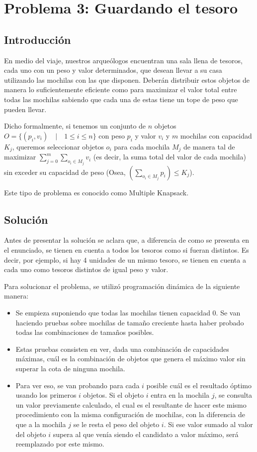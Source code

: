 \section{Problema 3: Guardando el tesoro}

\subsection{Introducción}

En medio del viaje, nuestros arqueólogos encuentran una sala llena de tesoros, cada uno con un peso y valor determinados, que desean llevar a su casa utilizando las mochilas con las que disponen. Deberán distribuir estos objetos de manera lo suficientemente eficiente como para maximizar el valor total entre todas las mochilas sabiendo que cada una de estas tiene un tope de peso que pueden llevar.

Dicho formalmente, si tenemos un conjunto de $n$ objetos $O = \{(p_i,v_i) \quad | \quad 1 \leq i \leq n\}$ con peso $p_i$ y valor $v_i$ y $m$ mochilas con capacidad $K_j$, queremos seleccionar objetos $o_i$ para cada mochila $M_j$ de manera tal de maximizar $\sum_{j = 0}^m\sum_{o_i \in M_j} v_i$ (es decir, la suma total del valor de cada mochila) sin exceder su capacidad de peso (Osea, $(\sum_{o_i \in M_j} p_i) \leq K_j$).

Este tipo de problema es conocido como Multiple Knapsack.

\subsection{Solución}

Antes de presentar la solución se aclara que, a diferencia de como se presenta en el enunciado, se tienen en cuenta a todos los tesoros como si fueran distintos. Es decir, por ejemplo, si hay 4 unidades de un mismo tesoro, se tienen en cuenta a cada uno como tesoros distintos de igual peso y valor.

Para solucionar el problema, se utilizó programación dinámica de la siguiente manera:

\begin{itemize}
\item Se empieza suponiendo que todas las mochilas tienen capacidad 0. Se van haciendo pruebas sobre mochilas de tamaño creciente hasta haber probado todas las combinaciones de tamaños posibles.
\item Estas pruebas consisten en ver, dada una combinación de capacidades máximas, cuál es la combinación de objetos que genera el máximo valor sin superar la cota de ninguna mochila.
\item Para ver eso, se van probando para cada $i$ posible cuál es el resultado óptimo usando los primeros $i$ objetos. Si el objeto $i$ entra en la mochila $j$, se consulta un valor previamente calculado, el cual es el resultante de hacer este mismo procedimiento con la misma configuración de mochilas, con la diferencia de que a la mochila $j$ se le resta el peso del objeto $i$. Si ese valor sumado al valor del objeto $i$ supera al que venía siendo el candidato a valor máximo, será reemplazado por este mismo.
\end{itemize}

